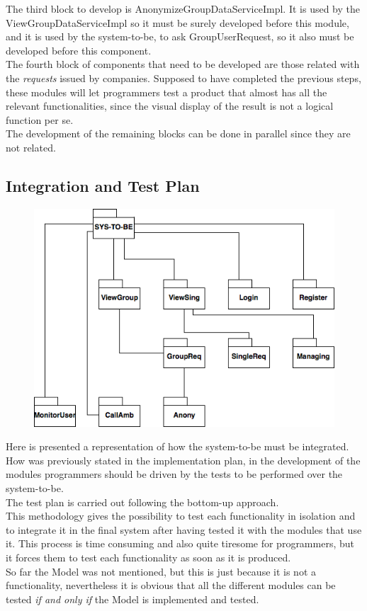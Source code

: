 \documentclass{article}
\begin{document}
The third block to develop is AnonymizeGroupDataServiceImpl. It is used by the ViewGroupDataServiceImpl so it must be surely developed before this module, and it is used by the system-to-be, to ask GroupUserRequest, so it also must be developed before this component. \\
The fourth block of components that need to be developed are those related with the \emph{requests} issued by companies. Supposed to have completed the previous steps, these modules will let programmers test a product that almost has all the relevant functionalities, since the visual display of the result is not a logical function per se. \\
The development of the remaining blocks can be done in parallel since they are not related.  
\subsection{Integration and Test Plan}
\begin{figure}[h!]
\centering
    \textbf{}\par\medskip
	\includegraphics[width= \linewidth]{Test.png}
\end{figure}
Here is presented a representation of how the system-to-be must be integrated. \\
How was previously stated in the implementation plan, in the development of the modules programmers should be driven by the tests to be performed over the system-to-be. \\
The test plan is carried out following the bottom-up approach. \\
This methodology gives the possibility to test each functionality in isolation and to integrate it in the final system after having tested it with the modules that use it. This process is time consuming and also quite tiresome for programmers, but it forces them to test each functionality as soon as it is produced. \\
So far the Model was not mentioned, but this is just because it is not a functionality, nevertheless it is obvious that all the different modules can be tested \emph{if and only if} the Model is implemented and tested. 
\newpage
\end{document}
